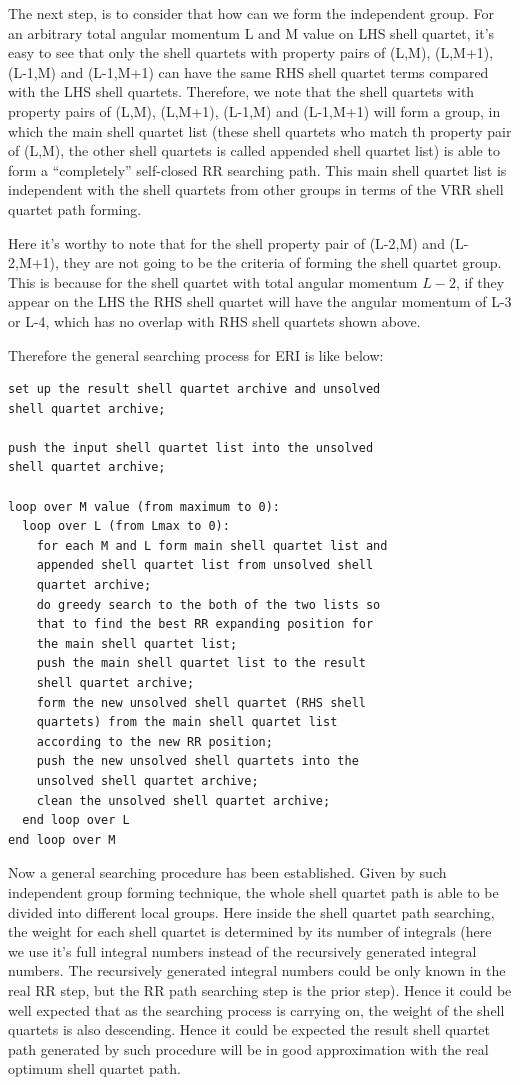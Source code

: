 The next step, is to consider that how can we form the independent group.
For an arbitrary total angular momentum L and M value on LHS shell quartet, 
it's easy to see that only the shell quartets with property pairs of (L,M), 
(L,M+1), (L-1,M) and (L-1,M+1) can have the same RHS shell quartet terms compared 
with the LHS shell quartets. Therefore, we note that the shell quartets with 
property pairs of (L,M), (L,M+1), (L-1,M) and (L-1,M+1) will form a 
group, in which the main shell quartet list (these shell quartets who
match th property pair of (L,M), the other shell quartets is called 
appended shell quartet list) is able to form a ``completely'' self-closed 
RR searching path. This main shell quartet list is independent with the 
shell quartets from other groups in terms of the VRR shell quartet path forming.

Here it's worthy to note that for the shell property pair of (L-2,M) and (L-2,M+1),
they are not going to be the criteria of forming the shell quartet group. This 
is because for the shell quartet with total angular momentum $L-2$, if they 
appear on the LHS the RHS shell quartet will have the angular momentum of L-3 or 
L-4, which has no overlap with RHS shell quartets shown above.

Therefore the general searching process for ERI is like below:
\begin{verbatim}
set up the result shell quartet archive and unsolved
shell quartet archive;

push the input shell quartet list into the unsolved
shell quartet archive;

loop over M value (from maximum to 0):
  loop over L (from Lmax to 0):
    for each M and L form main shell quartet list and 
    appended shell quartet list from unsolved shell
    quartet archive;
    do greedy search to the both of the two lists so
    that to find the best RR expanding position for 
    the main shell quartet list;
    push the main shell quartet list to the result
    shell quartet archive;
    form the new unsolved shell quartet (RHS shell 
    quartets) from the main shell quartet list 
    according to the new RR position;
    push the new unsolved shell quartets into the 
    unsolved shell quartet archive;
    clean the unsolved shell quartet archive;
  end loop over L
end loop over M
\end{verbatim}

Now a general searching procedure has been established. Given by 
such independent group forming technique, the whole shell quartet
path is able to be divided into different local groups. Here inside
the shell quartet path searching, the weight for each shell quartet
is determined by its number of integrals (here we use it's full integral
numbers instead of the recursively generated integral numbers. The 
recursively generated integral numbers could be only known in the real
RR step, but the RR path searching step is the prior step). Hence it could 
be well expected that as the searching process is carrying on, the weight
of the shell quartets is also descending. Hence it could be expected the 
result shell quartet path generated by such procedure will be in good 
approximation with the real optimum shell quartet path.

